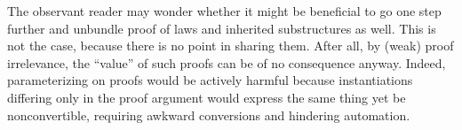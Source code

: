 \documentclass[a4paper,10pt,runningheads]{llncs}
\begin{document}

The observant reader may wonder whether it might be beneficial to go one step further and unbundle proof of laws and inherited substructures as well. This is not the case, because there is no point in sharing them. After all, by (weak) proof irrelevance, the ``value'' of such proofs can be of no consequence anyway. Indeed, parameterizing on proofs would be actively harmful because instantiations differing only in the proof argument would express the same thing yet be nonconvertible, requiring awkward conversions and hindering automation.

\end{document}
